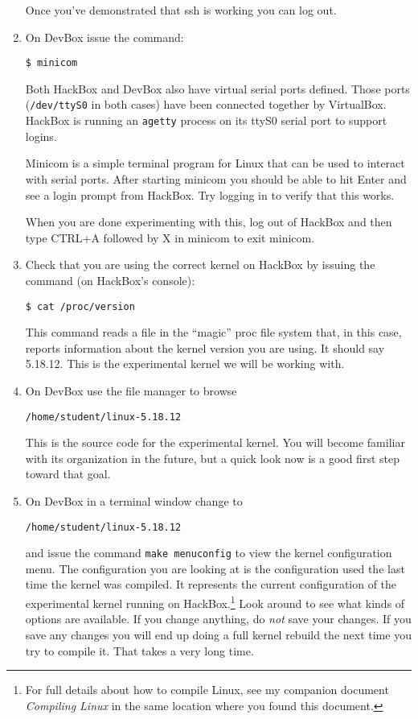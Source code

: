 \documentclass[twocolumn]{article}
\begin{document}
\begin{enumerate}
  Once you've demonstrated that ssh is working you can log out.

\item On DevBox issue the command:
\begin{Verbatim}
$ minicom
\end{Verbatim}
  Both HackBox and DevBox also have virtual serial ports defined. Those ports
  (\texttt{/dev/ttyS0} in both cases) have been connected together by VirtualBox. HackBox is
  running an \texttt{agetty} process on its ttyS0 serial port to support logins.

  Minicom is a simple terminal program for Linux that can be used to interact with serial ports.
  After starting minicom you should be able to hit Enter and see a login prompt from HackBox.
  Try logging in to verify that this works.

  When you are done experimenting with this, log out of HackBox and then type CTRL+A followed by
  X in minicom to exit minicom.

\item Check that you are using the correct kernel on HackBox by issuing the command (on
  HackBox's console):
\begin{Verbatim}
$ cat /proc/version
\end{Verbatim}
  This command reads a file in the ``magic'' proc file system that, in this case, reports
  information about the kernel version you are using. It should say 5.18.12. This is the
  experimental kernel we will be working with.

\item On DevBox use the file manager to browse
\begin{Verbatim}
/home/student/linux-5.18.12
\end{Verbatim}
  This is the source code for the experimental kernel. You will become familiar with its
  organization in the future, but a quick look now is a good first step toward that goal.

\item On DevBox in a terminal window change to
\begin{Verbatim}
/home/student/linux-5.18.12
\end{Verbatim}
  and issue the command \texttt{make menuconfig} to view the kernel configuration menu. The
  configuration you are looking at is the configuration used the last time the kernel was
  compiled. It represents the current configuration of the experimental kernel running on
  HackBox.\footnote{For full details about how to compile Linux, see my companion document
    \textit{Compiling Linux} in the same location where you found this document.} Look around to
  see what kinds of options are available. If you change anything, do \emph{not} save your
  changes. If you save any changes you will end up doing a full kernel rebuild the next time you
  try to compile it. That takes a very long time.


\end{enumerate}
\end{document}
